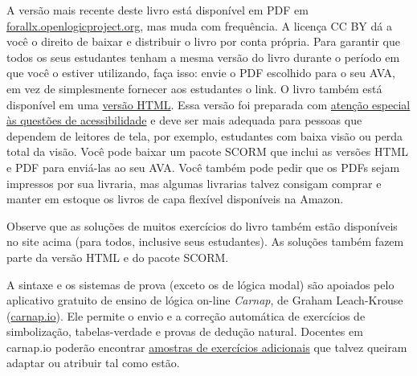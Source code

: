 A versão mais recente deste livro está disponível em PDF em
\href{https://forallx.openlogicproject.org}{forallx.openlogicproject.org},
mas muda com frequência. A licença CC BY dá a você o direito de
baixar e distribuir o livro por conta própria. Para garantir que todos os
seus estudantes tenham a mesma versão do livro durante o período em que você
o estiver utilizando, faça isso: envie o PDF escolhido para o seu AVA, em vez
de simplesmente fornecer aos estudantes o link. O livro também está disponível em
uma
\href{https://forallx.openlogicproject.org/html/}{versão HTML}. Essa
versão foi preparada com
\href{https://forallx.openlogicproject.org/html/A4.html}{atenção especial às
questões de acessibilidade} e deve ser mais adequada para pessoas que dependem
de leitores de tela, por exemplo, estudantes com baixa visão ou perda total da
visão. Você pode baixar um pacote SCORM que inclui as versões HTML e PDF para
enviá-las ao seu AVA. Você também pode pedir que os PDFs sejam impressos por sua
livraria, mas algumas livrarias talvez consigam comprar e manter em estoque os
livros de capa flexível disponíveis na Amazon.

Observe que as soluções de muitos exercícios do livro também estão disponíveis
no site acima (para todos, inclusive seus estudantes). As soluções também
fazem parte da versão HTML e do pacote SCORM.

A sintaxe e os sistemas de prova (exceto os de lógica modal) são apoiados pelo
aplicativo gratuito de ensino de lógica on-line \textit{Carnap}, de Graham
Leach-Krouse (\href{https://carnap.io}{carnap.io}). Ele permite o envio e a
correção automática de exercícios de simbolização, tabelas-verdade e provas de
dedução natural. Docentes em carnap.io poderão encontrar
\href{https://carnap.io/shared/rzach@ucalgary.ca/forall%20x:%20Calgary.md}{amostras de exercícios adicionais}
que talvez queiram adaptar ou atribuir tal como estão.
